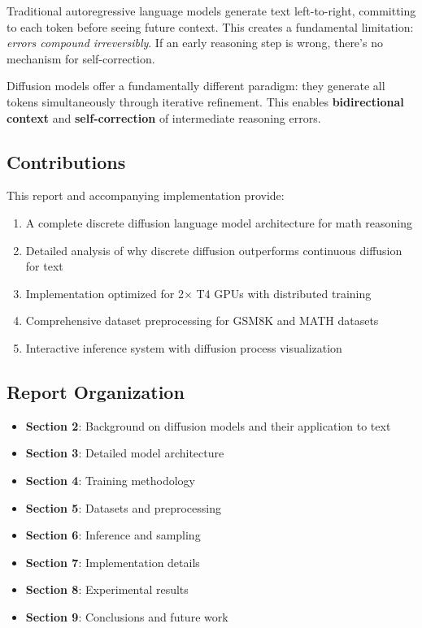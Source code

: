 \documentclass[11pt,a4paper]{article}
\begin{document}
Traditional autoregressive language models generate text left-to-right, committing to each token before seeing future context. This creates a fundamental limitation: \textit{errors compound irreversibly}. If an early reasoning step is wrong, there's no mechanism for self-correction.

\begin{keyinsight}
Diffusion models offer a fundamentally different paradigm: they generate all tokens simultaneously through iterative refinement. This enables \textbf{bidirectional context} and \textbf{self-correction} of intermediate reasoning errors.
\end{keyinsight}

\subsection{Contributions}

This report and accompanying implementation provide:

\begin{enumerate}
    \item A complete discrete diffusion language model architecture for math reasoning
    \item Detailed analysis of why discrete diffusion outperforms continuous diffusion for text
    \item Implementation optimized for 2× T4 GPUs with distributed training
    \item Comprehensive dataset preprocessing for GSM8K and MATH datasets
    \item Interactive inference system with diffusion process visualization
\end{enumerate}

\subsection{Report Organization}

\begin{itemize}
    \item \textbf{Section 2}: Background on diffusion models and their application to text
    \item \textbf{Section 3}: Detailed model architecture
    \item \textbf{Section 4}: Training methodology
    \item \textbf{Section 5}: Datasets and preprocessing
    \item \textbf{Section 6}: Inference and sampling
    \item \textbf{Section 7}: Implementation details
    \item \textbf{Section 8}: Experimental results
    \item \textbf{Section 9}: Conclusions and future work
\end{itemize}
\end{document}
